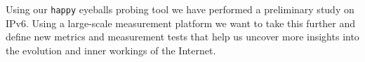Using our \texttt{happy} eyeballs probing tool we have performed a preliminary
study on IPv6. Using a large-scale measurement platform we want to take this
further and define new metrics and measurement tests that help us uncover
more insights into the evolution and inner workings of the Internet.



